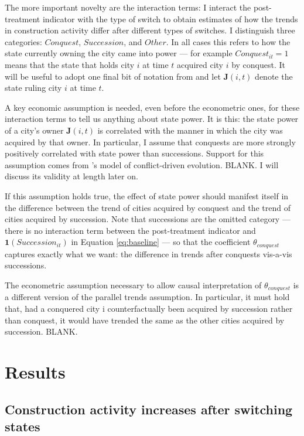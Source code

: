 \documentclass[11pt, a4paper]{article}
\begin{document}
The more important novelty are the interaction terms: I interact the post-treatment indicator with the type of switch to obtain estimates of how the trends in construction activity differ after different types of switches. I distinguish three categories: $Conquest$, $Succession$, and $Other$. In all cases this refers to how the state currently owning the city came into power --- for example $Conquest_{it} = 1$ means that the state that holds city $i$ at time $t$ acquired city $i$ by conquest. It will be useful to adopt one final bit of notation from \cite{schoenholzer2022} and let $\mathbf{J}(i, t)$ denote the state ruling city $i$ at time $t$.

A key economic assumption is needed, even before the econometric ones, for these interaction terms to tell us anything about state power. It is this: the state power of a city's owner $\mathbf{J}(i, t)$ is correlated with the manner in which the city was acquired by that owner. In particular, I assume that conquests are more strongly positively correlated with state power than successions. Support for this assumption comes from \cite{levine2021}'s model of conflict-driven evolution. BLANK. I will discuss its validity at length later on.

If this assumption holds true, the effect of state power should manifest itself in the difference between the trend of cities acquired by conquest and the trend of cities acquired by succession. Note that successions are the omitted category --- there is no interaction term between the post-treatment indicator and $\mathbf{1}(Succession_{it})$ in Equation \eqref{eq:baseline} --- so that the coefficient $\theta_{conquest}$ captures exactly what we want: the difference in trends after conquests vis-a-vis successions.

The econometric assumption necessary to allow causal interpretation of $\theta_{conquest}$ is a different version of the parallel trends assumption. In particular, it must hold that, had a conquered city i counterfactually been acquired by succession rather than conquest, it would have trended the same as the other cities acquired by succession. BLANK.



\section{Results} \label{sec:results}

\subsection{Construction activity increases after switching states}
\end{document}
